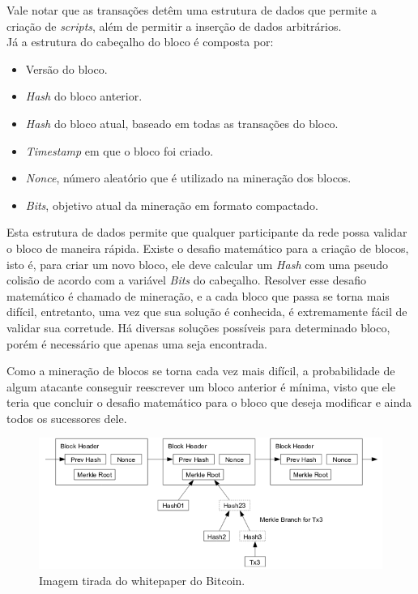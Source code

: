 \documentclass{ufsctex/ufsctex}
\begin{document}
Vale notar que as transações detêm uma estrutura de dados que permite a criação
de \textit{scripts}, além de permitir a inserção de dados arbitrários. \\

Já a estrutura do cabeçalho do bloco é composta por:
\begin{itemize}
	\item Versão do bloco.
	\item \textit{Hash} do bloco anterior.
	\item \textit{Hash} do bloco atual, baseado em todas as transações do bloco.
	\item \textit{Timestamp} em que o bloco foi criado.
	\item \textit{Nonce}, número aleatório que é utilizado na mineração dos blocos.
	\item \textit{Bits}, objetivo atual da mineração em formato compactado.
\end{itemize}

Esta estrutura de dados permite que qualquer participante da rede possa validar
o bloco de maneira rápida. Existe o desafio matemático para a criação de blocos,
isto é, para criar um novo bloco, ele deve calcular um \textit{Hash} com uma
pseudo colisão de acordo com a variável \textit{Bits} do cabeçalho. Resolver
esse desafio matemático é chamado de mineração, e a cada bloco que passa se
torna mais difícil, entretanto, uma vez que sua solução é conhecida, é
extremamente fácil de validar sua corretude. Há diversas soluções possíveis para
determinado bloco, porém é necessário que apenas uma seja
encontrada.\cite{Antonopoulos}

Como a mineração de blocos se torna cada vez mais difícil, a probabilidade de
algum atacante conseguir reescrever um bloco anterior é mínima, visto que ele
teria que concluir o desafio matemático para o bloco que deseja modificar e
ainda todos os sucessores dele.

\begin{figure}[h]
	\centering
	\includegraphics[scale=0.4]{blockchain}
	\caption{Imagem tirada do whitepaper do Bitcoin.}
	\label{fig:blockchain}
\end{figure}
\end{document}
